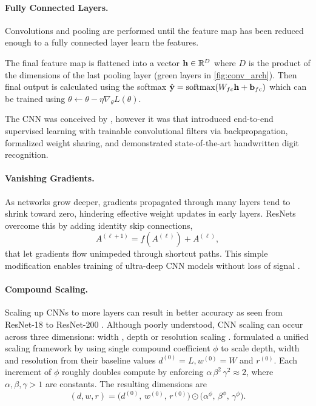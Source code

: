 \paragraph{Fully Connected Layers.}

Convolutions and pooling are performed until the feature map has been reduced enough to a fully connected layer learn the features.

The final feature map is flattened into a vector $\bold h \in \mathbb R^D$ where $D$  is the product of the dimensions of the last pooling layer (green layers in \cref{fig:conv_arch}). Then final output is calculated using the softmax $\hat{\bold{y}} = \text{softmax}(W_{fc}\bold h+\bold b_{fc})$ which can be trained using  $\theta \leftarrow \theta - \eta \nabla_{\theta}L(\theta)$.

The \ac{CNN} was conceived by \textcite{CONV1980}, however it was \textcite{CONV1989} that introduced end-to-end supervised learning with trainable convolutional filters via backpropagation, formalized weight sharing, and demonstrated state-of-the-art handwritten digit recognition.

\paragraph{Vanishing Gradients.}

As networks grow deeper, gradients propagated through many layers tend to shrink toward zero, hindering effective weight updates in early layers. ResNets overcome this by adding identity skip connections,
\begin{equation*}
    A^{(\ell + 1)} = f(A^{(\ell)}) + A^{(\ell)},
\end{equation*}
that let gradients flow unimpeded through shortcut paths. This simple modification enables training of ultra-deep \ac{CNN} models without loss of signal \cite{RESNET2016}.

\paragraph{Compound Scaling.}

Scaling up \acp{CNN} to more layers can result in better accuracy as seen from ResNet-18 to ResNet-200 \cite{RESNET2016}. Although poorly understood, \ac{CNN} scaling can occur across three dimensions: width \cite{WIDERESNETS2016}, depth \cite{RESNET2016} or resolution scaling \cite{GPIPE2019}. \textcite{EFFICIENTNET2020} formulated a unified scaling framework by using single compound coefficient $\phi$ to scale depth, width and resolution from their baseline values $d^{(0)} = L, w^{(0)} = W$ and $r^{(0)}$. Each increment of $\phi$ roughly doubles compute by enforcing $ \alpha\,\beta^{2}\,\gamma^{2}\approx 2$, where $\alpha,\beta,\gamma>1$ are constants. The resulting dimensions are \begin{equation*}
(d,w,r) = \bigl(d^{(0)},\,w^{(0)},\,r^{(0)}\bigr) \odot \bigl(\alpha^{\phi},\,\beta^{\phi},\,\gamma^{\phi}\bigr).
\end{equation*}

